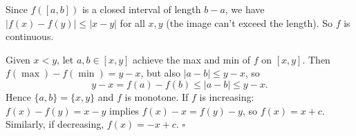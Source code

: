 \documentclass{article}
\begin{document}
Since \( f([a,b]) \) is a closed interval of length \( b - a \), we have \( |f(x) - f(y)| \leq |x - y| \) for all \( x, y \) (the image can't exceed the length). So \( f \) is continuous.

Given \( x < y \), let \( a, b \in [x, y] \) achieve the max and min of \( f \) on \( [x, y] \). Then \( f(\max) - f(\min) = y - x \), but also \( |a - b| \leq y - x \), so
\[
y - x = f(a) - f(b) \leq |a - b| \leq y - x.
\]
Hence \( \{a, b\} = \{x, y\} \) and \( f \) is monotone. If \( f \) is increasing:
\( f(x) - f(y) = x - y \) implies \( f(x) - x = f(y) - y \), so \( f(x) = x + c \).
Similarly, if decreasing, \( f(x) = -x + c \). \hfill\(\square\)
\end{document}
